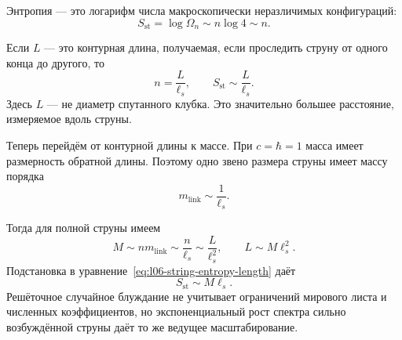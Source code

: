 Энтропия — это логарифм числа макроскопически неразличимых конфигураций:
\begin{equation}
S_{\mathrm{st}}=\log\Omega_n\sim n\log4\sim n.
\label{eq:l06-string-entropy-n}
\end{equation}

\begin{classroomqa}
\end{classroomqa}

Если \(L\) — это контурная длина, получаемая, если проследить струну от одного конца до другого, то
\begin{equation}
n=\frac{L}{\ell_s},
\qquad
S_{\mathrm{st}}\sim\frac{L}{\ell_s}.
\label{eq:l06-string-entropy-length}
\end{equation}
Здесь \(L\) — не диаметр спутанного клубка. Это значительно большее расстояние, измеряемое вдоль струны.

Теперь перейдём от контурной длины к массе. При \(c=\hbar=1\) масса имеет размерность обратной длины. Поэтому одно звено размера струны имеет массу порядка
\begin{equation}
m_{\mathrm{link}}\sim\frac{1}{\ell_s}.
\label{eq:l06-link-mass}
\end{equation}

\begin{classroomqa}
\end{classroomqa}

Тогда для полной струны имеем
\begin{equation}
M\sim n m_{\mathrm{link}}
\sim\frac{n}{\ell_s}
\sim\frac{L}{\ell_s^2},
\qquad
L\sim M\ell_s^2.
\label{eq:l06-string-mass}
\end{equation}
Подстановка в уравнение~\eqref{eq:l06-string-entropy-length} даёт
\begin{equation}
S_{\mathrm{st}}\sim M\ell_s.
\label{eq:l06-string-entropy-mass}
\end{equation}
Решёточное случайное блуждание не учитывает ограничений мирового листа и численных коэффициентов, но экспоненциальный рост спектра сильно возбуждённой струны даёт то же ведущее масштабирование.

